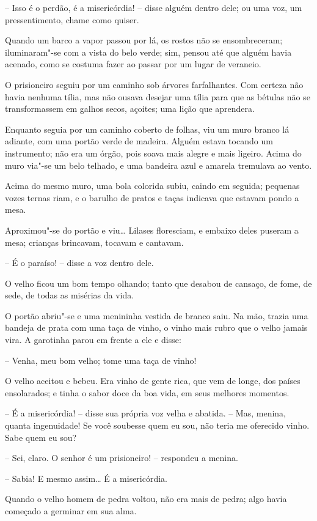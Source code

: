 -- Isso é o perdão, é a misericórdia! -- disse alguém dentro dele; ou uma
voz, um pressentimento, chame como quiser.

Quando um barco a vapor passou por lá, os rostos não se ensombreceram;
iluminaram"-se com a vista do belo verde; sim, pensou até que alguém
havia acenado, como se costuma fazer ao passar por um lugar de
veraneio.

O prisioneiro seguiu por um caminho sob árvores farfalhantes. Com
certeza não havia nenhuma tília, mas não ousava desejar uma tília para
que as bétulas não se transformassem em galhos secos, açoites; uma
lição que aprendera.

Enquanto seguia por um caminho coberto de folhas, viu um muro branco lá
adiante, com uma portão verde de madeira. Alguém estava tocando um
instrumento; não era um órgão, pois soava mais alegre e mais ligeiro.
Acima do muro via"-se um belo telhado, e uma bandeira azul e amarela
tremulava ao vento.

Acima do mesmo muro, uma bola colorida subiu, caindo em seguida;
pequenas vozes ternas riam, e o barulho de pratos e taças indicava que
estavam pondo a mesa.

Aproximou"-se do portão e viu\ldots{} Lilases floresciam, e embaixo deles
puseram a mesa; crianças brincavam, tocavam e cantavam.

-- É o paraíso! -- disse a voz dentro dele.

O velho ficou um bom tempo olhando; tanto que desabou de
cansaço, de fome, de sede, de todas as misérias da vida.

O portão abriu"-se e uma menininha vestida de branco saiu. Na mão,
trazia uma bandeja de prata com uma taça de vinho, o vinho mais rubro
que o velho jamais vira. A garotinha parou em frente a ele e disse:

-- Venha, meu bom velho; tome uma taça de vinho!

O velho aceitou e bebeu. Era vinho de gente rica, que vem de longe, dos
países ensolarados; e tinha o sabor doce da boa vida, em seus melhores
momentos.

-- É a misericórdia! -- disse sua própria voz velha e abatida. -- Mas,
menina, quanta ingenuidade! Se você soubesse quem eu sou, não teria me
oferecido vinho. Sabe quem eu sou?

-- Sei, claro. O senhor é um prisioneiro! -- respondeu a menina.

-- Sabia! E mesmo assim\ldots{} É a misericórdia.

Quando o velho homem de pedra voltou, não era mais de pedra; algo havia
começado a germinar em sua alma.

